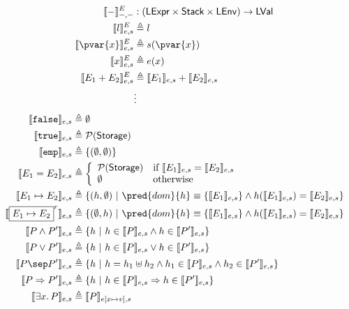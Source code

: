 \begin{align*}
\llbracket - \rrbracket_{-, -}^E &: (\mathsf{LExpr} \times \mathsf{Stack} \times \mathsf{LEnv}) \rightarrow \mathsf{LVal} \\
\llbracket l \rrbracket_{e, s}^E &\triangleq l \\
\llbracket \pvar{x} \rrbracket_{e, s}^E &\triangleq s(\pvar{x}) \\
\llbracket x \rrbracket_{e, s}^E &\triangleq e(x) \\
\llbracket E_1 + E_2 \rrbracket_{e, s}^E &\triangleq \llbracket E_1 \rrbracket_{e, s} + \llbracket E_2 \rrbracket_{e, s} \\
&\vdots
\end{align*}
\begin{align*}
\llbracket \mathtt{false} \rrbracket_{e, s} &\triangleq \emptyset \\
\llbracket \mathtt{true} \rrbracket_{e, s} &\triangleq \mathcal{P}(\mathsf{Storage}) \\
\llbracket \mathtt{emp} \rrbracket_{e, s} &\triangleq \{ (\emptyset, \emptyset) \} \\
\llbracket E_1 = E_2 \rrbracket_{e, s} &\triangleq \bigg\{ \begin{array}{l l}
\mathcal{P}(\mathsf{Storage}) & \text{if } \llbracket E_1 \rrbracket_{e, s} = \llbracket E_2 \rrbracket_{e, s} \\
\emptyset & \text{otherwise}
\end{array} \\
\llbracket E_1 \mapsto E_2 \rrbracket_{e, s} &\triangleq \{ (h, \emptyset)\ |\ \pred{dom}{h} \equiv \{ \llbracket E_1 \rrbracket_{e, s} \} \land h(\llbracket E_1 \rrbracket_{e, s}) = \llbracket E_2 \rrbracket_{e, s} \} \\
\llbracket \boxed{E_1 \mapsto E_2}^r \rrbracket_{e, s} &\triangleq \{ (\emptyset, h)\ |\ \pred{dom}{h} \equiv \{ \llbracket E_1 \rrbracket_{e, s} \} \land h(\llbracket E_1 \rrbracket_{e, s}) = \llbracket E_2 \rrbracket_{e, s} \} \\
\llbracket P \land P' \rrbracket_{e, s} &\triangleq \{ h\ |\ h \in \llbracket P \rrbracket_{e, s} \land h \in \llbracket P' \rrbracket_{e, s} \} \\
\llbracket P \lor P' \rrbracket_{e, s} &\triangleq \{ h\ |\ h \in \llbracket P \rrbracket_{e, s} \lor h \in \llbracket P' \rrbracket_{e, s} \} \\
\llbracket P \sep P' \rrbracket_{e, s} &\triangleq \{ h\ |\ h = h_1 \uplus h_2 \land h_1 \in \llbracket P \rrbracket_{e, s} \land h_2 \in \llbracket P' \rrbracket_{e, s} \} \\
\llbracket P \Rightarrow P' \rrbracket_{e, s} &\triangleq \{ h\ |\ h \in \llbracket P \rrbracket_{e, s} \Rightarrow h \in \llbracket P' \rrbracket_{e, s} \} \\
\llbracket \exists x \ldotp P \rrbracket_{e, s} &\triangleq \llbracket P \rrbracket_{e[x \mapsto v], s}
\end{align*}

